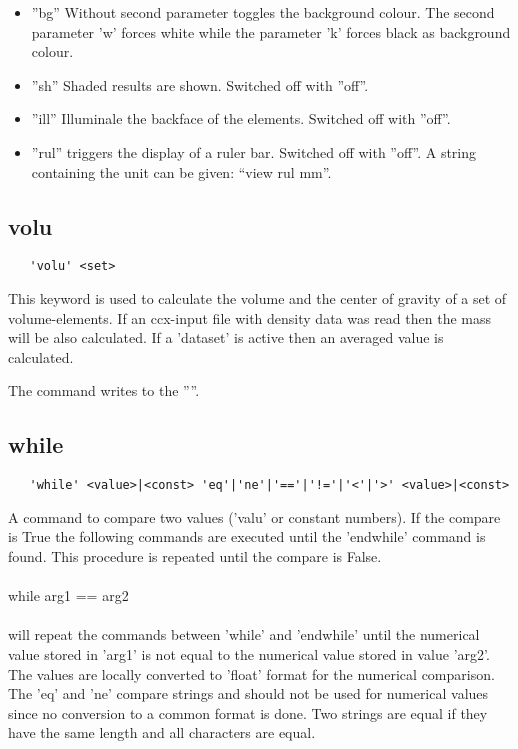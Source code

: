 \documentclass{article}
\begin{document}
\begin{itemize}
\item ''bg'' Without second parameter toggles the background colour. The second parameter 'w' forces white while the parameter 'k' forces black as background colour.
\item ''sh'' Shaded results are shown. Switched off with ''off''. 
\item ''ill'' Illuminale the backface of the elements. Switched off with ''off''. 
\item ''rul'' triggers the display of a ruler bar. Switched off with ''off''. A string containing the unit can be given: ``view rul mm''. 
\end{itemize}  

\subsection{\label{volu}volu}
\begin{verbatim}
   'volu' <set>
\end{verbatim}
This keyword is used to calculate the volume and the center of gravity of a set of volume-elements. If an ccx-input file with density data was read then the mass will be also calculated. If a 'dataset' is active then an averaged value is calculated.

The command writes to the ''''.

\subsection{\label{while}while}
\begin{verbatim}
   'while' <value>|<const> 'eq'|'ne'|'=='|'!='|'<'|'>' <value>|<const>
\end{verbatim}
A command to compare two values ('valu' or constant numbers). If the compare is True the following commands are executed until the 'endwhile' command is found. This procedure is repeated until the compare is False.
\\\\while arg1 == arg2\\\\will repeat the commands between 'while' and 'endwhile' until the numerical value stored in 'arg1' is not equal to the numerical value stored in value 'arg2'. The values are locally converted to 'float' format for the numerical comparison. The 'eq' and 'ne' compare strings and should not be used for numerical values since no conversion to a common format is done. Two strings are equal if they have the same length and all characters are equal.
\end{document}
